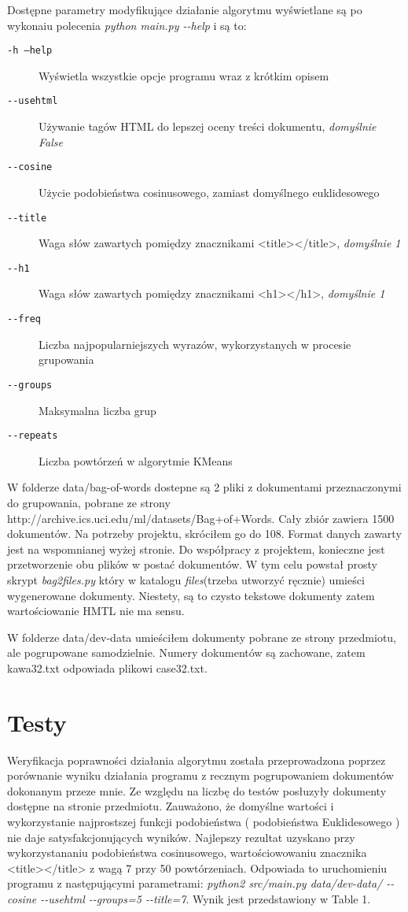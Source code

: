 \documentclass{article}
\begin{document}
Dostępne parametry modyfikujące działanie algorytmu wyświetlane są po wykonaiu polecenia \emph{python main.py -{}-help} i są to:
\begin{description}
\item [\texttt{-h --help}] Wyświetla wszystkie opcje programu wraz z krótkim opisem
\item [\texttt{-{}-usehtml}] Używanie tagów HTML do lepszej oceny treści dokumentu, \emph{domyślnie False}
\item [\texttt{-{}-cosine}] Użycie podobieństwa cosinusowego, zamiast domyślnego euklidesowego
\item [\texttt{-{}-title}] Waga słów zawartych pomiędzy znacznikami <title></title>, \emph{domyślnie 1}
\item [\texttt{-{}-h1}] Waga słów zawartych pomiędzy znacznikami <h1></h1>, \emph{domyślnie 1}
\item [\texttt{-{}-freq}] Liczba najpopularniejszych wyrazów, wykorzystanych w procesie grupowania
\item [\texttt{-{}-groups}] Maksymalna liczba grup
\item [\texttt{-{}-repeats}] Liczba powtórzeń w algorytmie KMeans
\end{description}

W folderze data/bag-of-words dostepne są 2 pliki z dokumentami przeznaczonymi do grupowania, pobrane ze strony http://archive.ics.uci.edu/ml/datasets/Bag+of+Words. Cały zbiór zawiera 1500 dokumentów. Na potrzeby projektu, skróciłem go do 108. Format danych zawarty jest na wspomnianej wyżej stronie. Do współpracy z projektem, konieczne jest przetworzenie obu plików w postać dokumentów. W tym celu powstał prosty skrypt \emph{bag2files.py} który w katalogu \emph{files}(trzeba utworzyć ręcznie) umieści wygenerowane dokumenty. Niestety, są to czysto tekstowe dokumenty zatem wartościowanie HMTL nie ma sensu.

W folderze data/dev-data umieściłem dokumenty pobrane ze strony przedmiotu, ale pogrupowane samodzielnie. Numery dokumentów są zachowane, zatem kawa32.txt odpowiada plikowi case32.txt.

\section{Testy}
Weryfikacja poprawności działania algorytmu została przeprowadzona poprzez porównanie wyniku działania programu z recznym pogrupowaniem dokumentów dokonanym przeze mnie. Ze względu na liczbę do testów posłuzyły dokumenty dostępne na stronie przedmiotu. Zauważono, że domyślne wartości i wykorzystanie najprostszej funkcji podobieństwa ( podobieństwa Euklidesowego ) nie daje satysfakcjonujących wyników. Najlepszy rezultat uzyskano przy wykorzystananiu podobieństwa cosinusowego, wartościowowaniu znacznika <title></title> z wagą 7 przy 50 powtórzeniach. Odpowiada to uruchomieniu programu z następującymi parametrami: \emph{python2 src/main.py data/dev-data/ -{}-cosine -{}-usehtml -{}-groups=5  -{}-title=7}. Wynik jest przedstawiony w Table 1. 
\end{document}
